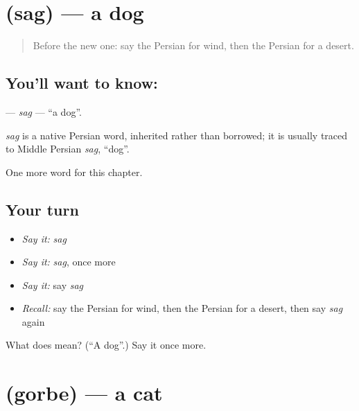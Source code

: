 \section[\texorpdfstring{\fa{سگ} (sag)}{سگ (sag)}]{ (sag) — a dog}

\label{lesson:FA-C54-sag}



\begin{quote}
Before the new one: say the Persian for wind, then the Persian for a desert.
\end{quote}

\subsection*{You'll want to know: }
\textbf{} — \emph{sag} — \textquotedblleft{}a dog\textquotedblright{}.

\begin{cousinweb}
\emph{sag} is a native Persian word, inherited rather than borrowed; it is usually traced to Middle Persian \emph{sag}, \textquotedblleft{}dog\textquotedblright{}.
\end{cousinweb}

\begin{grammarlens}[title={What you've built}]
One more word for this chapter.
\end{grammarlens}

\subsection*{Your turn}
\begin{itemize}
\raggedright
  \item \emph{Say it:} \emph{sag}
  \item \emph{Say it:} \emph{sag}, once more
  \item \emph{Say it:} say \emph{sag}
  \item \emph{Recall:} say the Persian for wind, then the Persian for a desert, then say \emph{sag} again
\end{itemize}

\begin{tcolorbox}[breakable,colback=teal!4,colframe=teal!35!black,title={Before you move on}]
What does  mean? (\textquotedblleft{}A dog\textquotedblright{}.) Say it once more.
\end{tcolorbox}
\section[\texorpdfstring{\fa{گربه} (gorbe)}{گربه (gorbe)}]{ (gorbe) — a cat}

